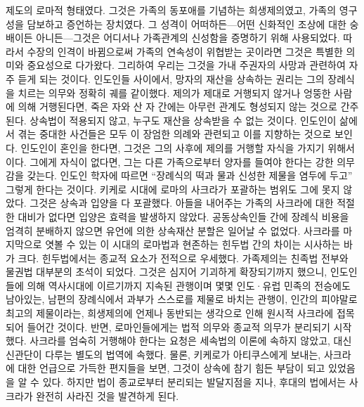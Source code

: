 제도의 로마적 형태였다.
그것은 가족의 동포애를 기념하는 희생제의였고,
가족의 영구성을 담보하고 증언하는 장치였다.
그 성격이 어떠하든---어떤 신화적인 조상에 대한 숭배이든 아니든---그것은
어디서나 가족관계의 신성함을 증명하기 위해 사용되었다.
따라서 수장의 인격이 바뀜으로써 가족의 연속성이 위협받는 곳이라면
그것은 특별한 의미와 중요성으로 다가왔다.
그리하여 우리는 그것을 가내 주권자의 사망과 관련하여 자주 듣게 되는 것이다.
인도인들 사이에서, 망자의 재산을 상속하는 권리는 그의 장례식을 치르는 의무와
정확히 궤를 같이했다.
제의가 제대로 거행되지 않거나 엉뚱한 사람에 의해 거행된다면,
죽은 자와 산 자 간에는 아무런 관계도 형성되지 않는 것으로 간주된다.
상속법이 적용되지 않고, 누구도 재산을 상속받을 수 없는 것이다.
인도인이 삶에서 겪는 중대한 사건들은 모두 이 장엄한 의례와 관련되고 이를
지향하는 것으로 보인다.
인도인이 혼인을 한다면, 그것은
그의 사후에 제의를 거행할 자식을 가지기 위해서이다.
그에게 자식이 없다면,
그는 다른 가족으로부터 양자를 들여야 한다는 강한 의무감을 갖는다.
인도인 학자에 따르면 ``장례식의 떡과 물과 신성한 제물을 염두에 두고''
그렇게 한다는 것이다.
키케로 시대에 로마의 사크라가 포괄하는 범위도 그에 못지 않았다.
그것은 상속과 입양을 다 포괄했다.
아들을 내어주는 가족의 사크라에 대한 적절한 대비가 없다면
입양은 효력을 발생하지 않았다.
공동상속인들 간에 장례식 비용을 엄격히 분배하지 않으면
유언에 의한 상속재산 분할은 일어날 수 없었다.
사크라를 마지막으로 엿볼 수 있는
이 시대의 로마법과 현존하는 힌두법 간의 차이는
시사하는 바가 크다.
힌두법에서는 종교적 요소가 전적으로 우세했다.
가족제의는 친족법 전부와 물권법 대부분의 초석이 되었다.
그것은 심지어 기괴하게 확장되기까지 했으니,
인도인들에 의해 역사시대에 이르기까지 지속된 관행이며
몇몇 인도^^b7유럽 민족의 전승에도 남아있는,
남편의 장례식에서 과부가 스스로를 제물로 바치는 관행이,
인간의 피야말로 최고의 제물이라는, 희생제의에 언제나 동반되는 생각으로 인해
원시적 사크라에 접목되어 들어간 것이다.
반면, 로마인들에게는 법적 의무와 종교적 의무가 분리되기 시작했다.
사크라를 엄숙히 거행해야 한다는 요청은 세속법의 이론에 속하지 않았고,
대신 신관단이 다루는
별도의 법역에 속했다.
물론,
키케로가 아티쿠스에게 보내는,
사크라에 대한 언급으로 가득한
편지들을 보면, 그것이 상속에 참기 힘든 부담이 되고 있었음을 알 수 있다.
하지만 법이 종교로부터 분리되는 발달지점을 지나,
후대의 법에서는 사크라가 완전히 사라진 것을 발견하게 된다.

